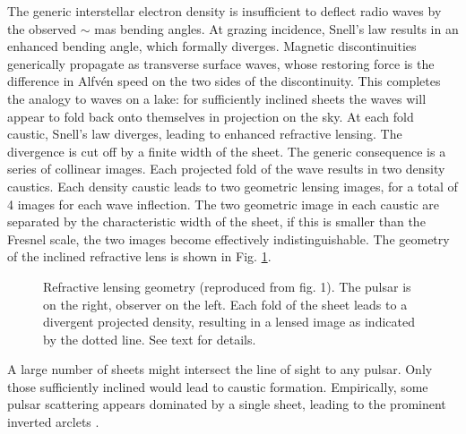 \documentclass[useAMS,usenatbib]{mn2e}
\begin{document}
The generic interstellar electron density is insufficient to deflect
radio waves by the observed $\sim$ mas bending angles. At grazing
incidence, Snell's law results in an enhanced bending angle, which
formally diverges.  Magnetic discontinuities generically propagate
as transverse surface waves, whose restoring force is the difference in Alfv\'en
speed on the two sides of the discontinuity. This completes the
analogy to waves on a lake: for sufficiently inclined sheets the waves
will appear to fold back onto themselves in projection on the sky.  At
each fold caustic, Snell's law diverges, leading to enhanced
refractive lensing.  The divergence is cut off by a finite width of
the sheet.  The generic consequence is a series of collinear images.
Each projected fold of the wave results in two density caustics.  Each density
caustic leads to two geometric lensing images, for a total of 4 images
for each wave inflection.  The two geometric image in each caustic are
separated by the characteristic width of the sheet, if this is smaller
than the Fresnel scale, the two images become effectively
indistinguishable. 
The geometry of the inclined refractive lens is shown in Fig. \ref{fig:sheetgeom}.
\begin{figure}
\vspace{-1.0in}
\centerline{}
\vspace{-7.5in}
\caption{Refractive lensing geometry 
(reproduced from \citet{2014MNRAS.442.3338P}
  fig. 1).  The pulsar is on the right, observer on the left.  Each
  fold of the sheet leads to a divergent projected density, resulting
  in a lensed image as indicated by the dotted line. See text for details.
}
\label{fig:sheetgeom}
\end{figure}



A large number of sheets might intersect the line of sight to any
pulsar. Only those sufficiently inclined would lead to caustic
formation. Empirically, some pulsar scattering appears dominated by a
single sheet, leading to the prominent inverted
arclets \citep{2001ApJ...549L..97S}.
\end{document}

